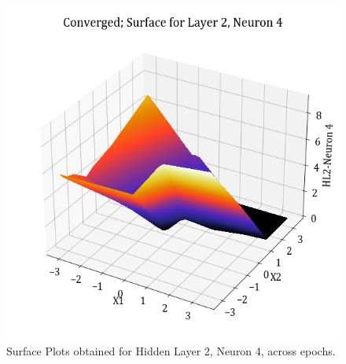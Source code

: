 \documentclass[11pt,a4paper]{article}
\begin{document}
\begin{figure}[H]
    \includegraphics[scale=0.4]{images/1B_MLFFNN_conv_HL2_N4.png}
    \caption{Surface Plots obtained for Hidden Layer 2, Neuron 4, across epochs.}
\end{figure}
\end{document}
